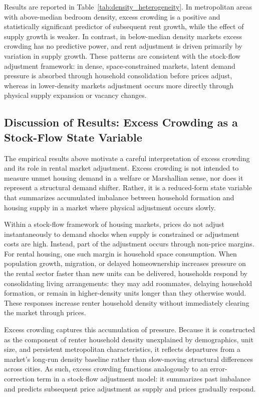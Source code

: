 \documentclass[pdflatex,sn-basic]{sn-jnl}%
\theoremstyle{thmstyleone}%
\theoremstyle{thmstyletwo}%
\theoremstyle{thmstylethree}%
\begin{document}
Results are reported in Table~\ref{tab:density_heterogeneity}. In metropolitan areas with
above-median bedroom density, excess crowding is a positive and statistically significant
predictor of subsequent rent growth, while the effect of supply growth is weaker. In
contrast, in below-median density markets excess crowding has no predictive power, and
rent adjustment is driven primarily by variation in supply growth. These patterns are
consistent with the stock-flow adjustment framework: in dense, space-constrained
markets, latent demand pressure is absorbed through household consolidation before prices
adjust, whereas in lower-density markets adjustment occurs more directly through physical
supply expansion or vacancy changes.

\subsection{Discussion of Results: Excess Crowding as a Stock-Flow State Variable}

The empirical results above motivate a careful interpretation of excess crowding and
its role in rental market adjustment. Excess crowding is not intended to measure
unmet housing demand in a welfare or Marshallian sense, nor does it represent a
structural demand shifter. Rather, it is a reduced-form state variable that summarizes
accumulated imbalance between household formation and housing supply in a market
where physical adjustment occurs slowly.

Within a stock-flow framework of housing markets, prices do not adjust
instantaneously to demand shocks when supply is constrained or adjustment costs are
high. Instead, part of the adjustment occurs through non-price margins. For rental
housing, one such margin is household space consumption. When population growth,
migration, or delayed homeownership increases pressure on the rental sector faster
than new units can be delivered, households respond by consolidating living
arrangements: they may add roommates, delaying household formation, or remain in
higher-density units longer than they otherwise would. These responses increase renter
household density without immediately clearing the market through prices.

Excess crowding captures this accumulation of pressure. Because it is constructed as
the component of renter household density unexplained by demographics, unit size, and
persistent metropolitan characteristics, it reflects departures from a market’s
long-run density baseline rather than slow-moving structural differences across cities.
As such, excess crowding functions analogously to an error-correction term in a
stock-flow adjustment model: it summarizes past imbalance and predicts subsequent
price adjustment as supply and prices gradually respond.
\end{document}
